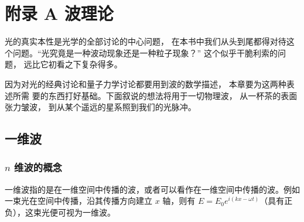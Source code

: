 \documentclass[UTF8]{report}
\theoremstyle{MyLineTheoremStyle} %
\theoremstyle{MyBlockTheoremStyle} %
\theoremstyle{MySubsubsectionStyle} %
\begin{document}


\newpage
\appendix
\titleformat{\chapter}[hang]{\normalfont\huge\bfseries\centering}{}{20pt}{}
\titlespacing*{\chapter}{0pt}{-25pt}{8pt} %
\titleformat{\section}[hang]{\normalfont\centering\Large\bfseries}{\thesection}{8pt}{}

\chapter*{附录 A\hspace*{20pt} 波理论}
\setcounter{chapter}{1}   
\setcounter{equation}{0}    %
\thispagestyle{fancy} 
\setcounter{section}{0}
\renewcommand\thesection{A.\arabic{section}}   
\renewcommand{\thefigure}{A.\arabic{figure}} 
\renewcommand{\thetable}{A.\arabic{table}}


光的真实本性是光学的全部讨论的中心问题， 在本书中我们从头到尾都得对待这个问题。“光究竟是一种波动现象还是一种粒子现象？” 这个似乎干脆利索的问题， 远比它初看之下复杂得多。

因为对光的经典讨论和量子力学讨论都要用到波的数学描述， 本章要为这两种表述所需
要的东西打好基础。下面叙说的想法将用于一切物理波， 从一杯茶的表面张力皱波， 到从某个遥远的星系照到我们的光脉冲。

\section{一维波}

\subsection{$n$ 维波的概念}

一维波指的是在一维空间中传播的波，或者可以看作在一维空间中传播的波。例如一束光在空间中传播，沿其传播方向建立 $x$ 轴，则有 $E = E_0 e^{i(kx - \omega t)}$（具有正负），这束光便可视为一维波。
\end{document}
